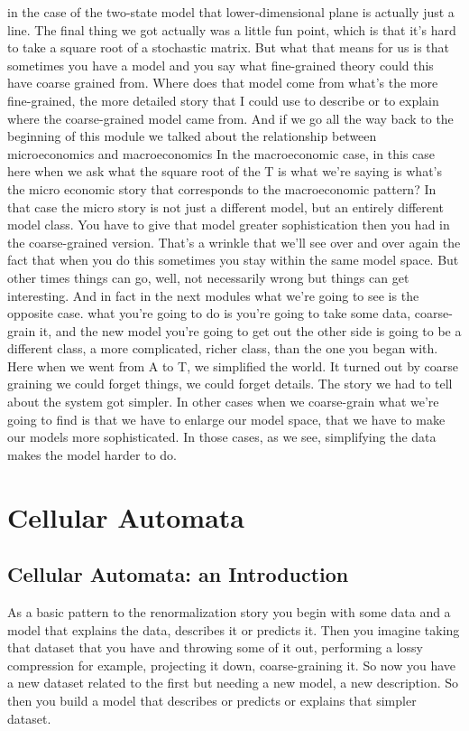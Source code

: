 \documentclass[]{article}
\begin{document}
in the case of the two-state model that
lower-dimensional plane is actually just a line.
The final thing we got
actually was a little fun point,
which is that it's hard to take
a square root of a stochastic matrix.
But what that means for us is that
sometimes you have a model
and you say what fine-grained theory
could this have coarse grained from.
Where does that model come from
what's the more fine-grained,
the more detailed story
that I could use to describe or to explain
where the coarse-grained model came from.
And if we go all the way back
to the beginning of this module
we talked about the relationship between
microeconomics and macroeconomics
In the macroeconomic case,
in this case here when we ask what
the square root of the T is what we're saying is
what's the micro economic story that
corresponds to the macroeconomic pattern?
In that case the micro story is
not just a different model,
but an entirely different model class.
You have to give that model
greater sophistication
then you had in the coarse-grained
version.
That's a wrinkle that we'll see
over and over again
the fact that when you do this sometimes
you stay within the same model space.
But other times things can go, well,
not necessarily wrong
but things can get interesting.
And in fact in the next modules
what we're going to see is
the opposite case.
what you're going to do is you're
going to take some data,
coarse-grain it,
and the new model you're going
to get out the other side
is going to be a different class,
a more complicated, richer class,
than the one you began with.
Here when we went from A to T, we simplified the world.
It turned out by coarse graining
we could forget things,
we could forget details.
The story we had to tell about the system
got simpler.
In other cases when we coarse-grain
what we're going to find is that
we have to enlarge our model space,
that we have to make our models
more sophisticated.
In those cases, as we see,
simplifying the data makes
the model harder to do. \cite{dedeo2016conflict}

\section{Cellular Automata}

\subsection{Cellular Automata: an Introduction}

As a basic pattern to the renormalization story you begin with some data
and a model that explains the data, describes it or predicts it.
Then you imagine taking that dataset that you have and throwing some of it out, performing a lossy compression for example, projecting it down, coarse-graining it.
So now you have a new dataset related to the first but needing a new model, a new description.
So then you build a model that describes or predicts or explains that simpler dataset.
\end{document}
